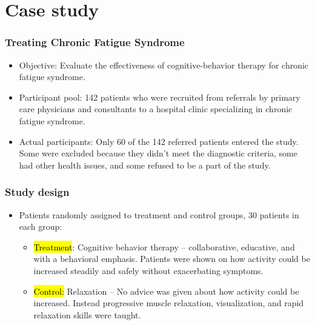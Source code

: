 
\section{Case study}


\begin{frame}
\frametitle{Treating Chronic Fatigue Syndrome}

\begin{itemize}

\item Objective: Evaluate the effectiveness of cognitive-behavior therapy for chronic fatigue syndrome.

\item Participant pool: 142 patients who were recruited from referrals by primary care physicians and consultants to a hospital clinic specializing in chronic fatigue syndrome.

\item Actual participants: Only 60 of the 142 referred patients entered the study. Some were excluded because they didn't meet the diagnostic criteria, some had other health issues, and some refused to be a part of the study.

\end{itemize}


\end{frame}


\begin{frame}
\frametitle{Study design}

\begin{itemize}

\item Patients randomly assigned to treatment and control groups, 30 patients in each group:
\begin{itemize}
\item \hl{Treatment}: Cognitive behavior therapy -- collaborative, educative, and with a behavioral emphasis. Patients were shown on how activity could be increased steadily and safely without exacerbating symptoms.
\item \hl{Control:} Relaxation -- No advice was given about how activity could be increased. Instead progressive muscle relaxation, visualization, and rapid relaxation skills were taught.
\end{itemize}

\end{itemize}

\end{frame}

